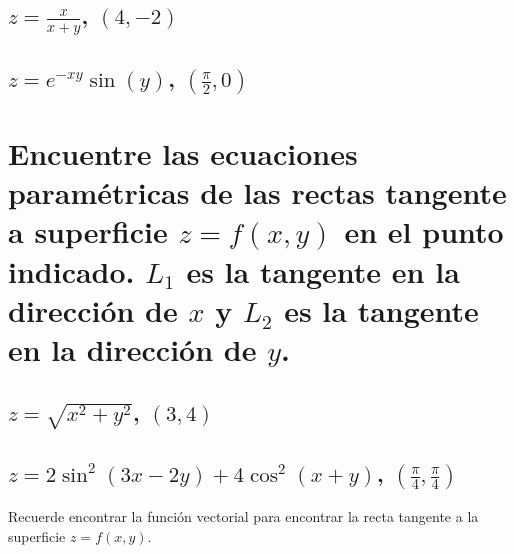 \documentclass{article}
\begin{document}
\subsection{$\displaystyle z=\frac{x}{x+y} $, $(4,-2)$}

\subsection{$\displaystyle z=e^{-xy}\sin(y)$, $\left(\frac{\pi }{2},0\right)$}



\section{Encuentre las ecuaciones paramétricas de las rectas tangente a superficie $z=f(x,y)$ en el punto indicado. $L_1$ es la tangente en la dirección de $x$ y $L_2$ es la tangente en la dirección de $y$.}


\subsection{$\displaystyle z=\sqrt{x^2+y^2}$, $(3,4 )$}

\subsection{$\displaystyle z=2\sin^2(3x-2y)+4\cos^2(x+y)$, $\left(\frac{\pi }{4}, \frac{\pi }{4}\right)$}
Recuerde encontrar la función vectorial para encontrar la recta tangente a la superficie $z=f(x,y)$.
\end{document}
